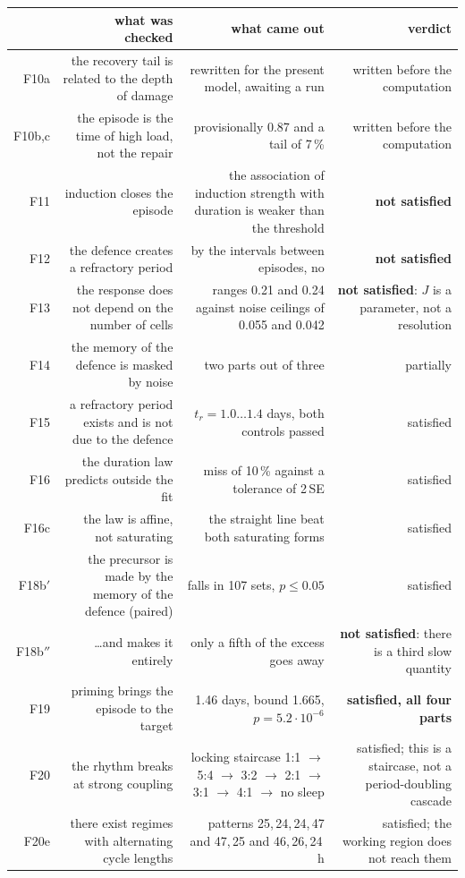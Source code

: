\begin{table}[p]\small\centering
\begin{tabular}{@{}R{0.04}R{0.30}R{0.32}R{0.27}@{}}
\toprule
 & \textbf{what was checked} & \textbf{what came out} & \textbf{verdict}\\
\midrule
F10a & the recovery tail is related to the depth of damage & rewritten for the present model, awaiting a run & written before the computation\\
F10b,c & the episode is the time of high load, not the repair & provisionally 0.87 and a tail of 7\,\% & written before the computation\\
F11 & induction closes the episode & the association of induction strength with duration is weaker than the threshold & \textbf{not satisfied}\\
F12 & the defence creates a refractory period & by the intervals between episodes, no & \textbf{not satisfied}\\
F13 & the response does not depend on the number of cells & ranges 0.21 and 0.24 against noise ceilings of 0.055 and 0.042 & \textbf{not satisfied}: $J$ is a parameter, not a resolution\\
F14 & the memory of the defence is masked by noise & two parts out of three & partially\\
F15 & a refractory period exists and is not due to the defence & $t_r=1.0\dots1.4$ days, both controls passed & satisfied\\
F16 & the duration law predicts outside the fit & miss of 10\,\% against a tolerance of 2\,SE & satisfied\\
F16c & the law is affine, not saturating & the straight line beat both saturating forms & satisfied\\
F18b$'$ & the precursor is made by the memory of the defence (paired) & falls in 107 sets, $p\le0.05$ & satisfied\\
F18b$''$ & \dots and makes it entirely & only a fifth of the excess goes away & \textbf{not satisfied}: there is a third slow quantity\\
F19 & priming brings the episode to the target & 1.46 days, bound 1.665, $p=5.2\cdot10^{-6}$ & \textbf{satisfied, all four parts}\\
F20 & the rhythm breaks at strong coupling & locking staircase 1:1 $\to$ 5:4 $\to$ 3:2 $\to$ 2:1 $\to$ 3:1 $\to$ 4:1 $\to$ no sleep & satisfied; this is a staircase, not a period-doubling cascade\\
F20e & there exist regimes with alternating cycle lengths & patterns 25,\,24,\,24,\,47 and 47,\,25 and 46,\,26,\,24\,h & satisfied; the working region does not reach them\\

\end{tabular}
\end{table}
